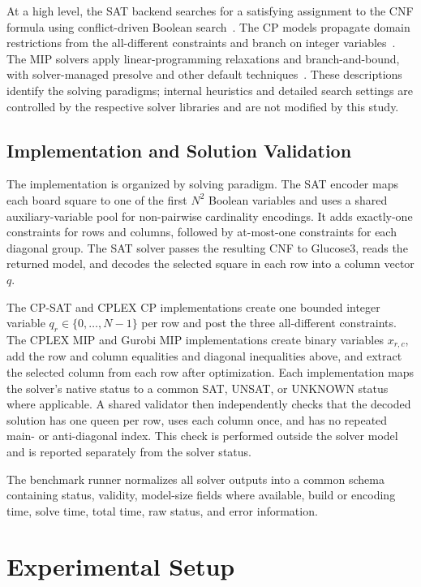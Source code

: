 \documentclass[a4paper,fleqn]{cas-sc}
\begin{document}
At a high level, the SAT backend searches for a satisfying assignment to the CNF formula using conflict-driven Boolean search~\citep{ignatiev2018pysat}. The CP models propagate domain restrictions from the all-different constraints and branch on integer variables~\citep{ortools,cplex}. The MIP solvers apply linear-programming relaxations and branch-and-bound, with solver-managed presolve and other default techniques~\citep{cplex,gurobi}. These descriptions identify the solving paradigms; internal heuristics and detailed search settings are controlled by the respective solver libraries and are not modified by this study.

\subsection{Implementation and Solution Validation}

The implementation is organized by solving paradigm. The SAT encoder maps each board square to one of the first $N^2$ Boolean variables and uses a shared auxiliary-variable pool for non-pairwise cardinality encodings. It adds exactly-one constraints for rows and columns, followed by at-most-one constraints for each diagonal group. The SAT solver passes the resulting CNF to Glucose3, reads the returned model, and decodes the selected square in each row into a column vector $q$.

The CP-SAT and CPLEX CP implementations create one bounded integer variable $q_r\in\{0,\ldots,N-1\}$ per row and post the three all-different constraints. The CPLEX MIP and Gurobi MIP implementations create binary variables $x_{r,c}$, add the row and column equalities and diagonal inequalities above, and extract the selected column from each row after optimization. Each implementation maps the solver's native status to a common SAT, UNSAT, or UNKNOWN status where applicable. A shared validator then independently checks that the decoded solution has one queen per row, uses each column once, and has no repeated main- or anti-diagonal index. This check is performed outside the solver model and is reported separately from the solver status.

The benchmark runner normalizes all solver outputs into a common schema containing status, validity, model-size fields where available, build or encoding time, solve time, total time, raw status, and error information.

\section{Experimental Setup}
\end{document}
